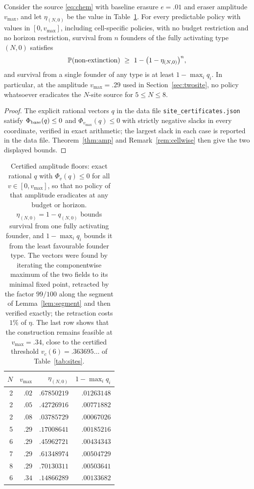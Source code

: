\begin{proposition}\label{prop:ampfloor}
Consider the source \eqref{eq:chem} with baseline erasure $e=.01$ and eraser
amplitude $v_{\max}$, and let $\eta_{(N,0)}$ be the value in
Table~\ref{tab:amp}. For every predictable policy with values in $[0,v_{\max}]$,
including cell-specific policies, with no budget restriction and no horizon
restriction, survival from $n$ founders of the fully activating type $(N,0)$
satisfies
\[
 \Prob(\text{non-extinction})\ \ge\ 1-\bigl(1-\eta_{(N,0)}\bigr)^n ,
\]
and survival from a single founder of any type is at least
$1-\max_iq_i$. In particular, at the amplitude $v_{\max}=.29$ used in
Section~\ref{sec:twosite}, no policy whatsoever eradicates the $N$-site source
for $5\le N\le8$.
\end{proposition}

\begin{proof}
The explicit rational vectors $q$ in the data file \texttt{site\_certificates.json}
satisfy $\Phi_{\mathrm{base}}(q)\le0$ and $\Phi_{v_{\max}}(q)\le0$ with strictly negative
slacks in every coordinate, verified in exact arithmetic; the largest slack in
each case is reported in the data file. Theorem~\ref{thm:amp} and
Remark~\ref{rem:cellwise} then give the two displayed bounds.
\end{proof}

\begin{table}[t]
\centering
\caption{Certified amplitude floors: exact rational $q$ with
$\Phi_v(q)\le0$ for all $v\in[0,v_{\max}]$, so that no policy of that amplitude
eradicates at any budget or horizon. $\eta_{(N,0)}=1-q_{(N,0)}$ bounds survival
from one fully activating founder, and $1-\max_iq_i$ bounds it from the least
favourable founder type. The vectors were found by iterating the componentwise
maximum of the two fields to its minimal fixed point, retracted by the factor
$99/100$ along the segment of Lemma~\ref{lem:segment} and then verified exactly;
the retraction costs $1\%$ of $\eta$. The last row shows that the construction
remains feasible at $v_{\max}=.34$, close to the certified threshold
$v_c(6)=.363695\ldots$ of Table~\ref{tab:sites}.}
\label{tab:amp}
\begin{tabular}{rrrr}
\toprule
$N$ & $v_{\max}$ & $\eta_{(N,0)}$ & $1-\max_iq_i$\\
\midrule
2 & $.02$ & $.67850219$ & $.01263148$\\
2 & $.05$ & $.42726916$ & $.00771882$\\
2 & $.08$ & $.03785729$ & $.00067026$\\
\midrule
5 & $.29$ & $.17008641$ & $.00185216$\\
6 & $.29$ & $.45962721$ & $.00434343$\\
7 & $.29$ & $.61348974$ & $.00504729$\\
8 & $.29$ & $.70130311$ & $.00503641$\\
\midrule
6 & $.34$ & $.14866289$ & $.00133682$\\
\bottomrule
\end{tabular}
\end{table}

